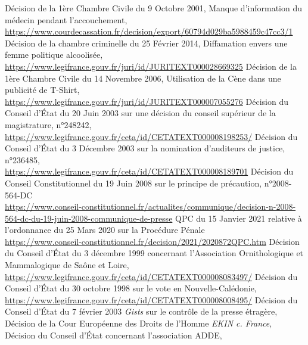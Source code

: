 \documentclass[math]{cours}
\begin{document}
\begin{thebibliography}{255}
		Décision de la 1ère Chambre Civile du 9 Octobre 2001, Manque d'information du médecin pendant l'accouchement,\\
		\url{https://www.courdecassation.fr/decision/export/60794d029ba5988459c47cc3/1}
		Décision de la chambre criminelle du 25 Février 2014, Diffamation envers une femme politique alcoolisée,\\
		\url{https://www.legifrance.gouv.fr/juri/id/JURITEXT000028669325}
		Décision de la 1ère Chambre Civile du 14 Novembre 2006, Utilisation de la Cène dans une publicité de T-Shirt,\\
		\url{https://www.legifrance.gouv.fr/juri/id/JURITEXT000007055276}
		Décision du Conseil d'État du 20 Juin 2003 sur une décision du conseil supérieur de la magistrature, n°248242,\\
		\url{https://www.legifrance.gouv.fr/ceta/id/CETATEXT000008198253/}
		Décision du Conseil d'État du 3 Décembre 2003 sur la nomination d'auditeurs de justice, n°236485,\\
		\url{https://www.legifrance.gouv.fr/ceta/id/CETATEXT000008189701}
		Décision du Conseil Constitutionnel du 19 Juin 2008 sur le principe de précaution, n°2008-564-DC\\
		\url{https://www.conseil-constitutionnel.fr/actualites/communique/decision-n-2008-564-dc-du-19-juin-2008-communique-de-presse}
		QPC du 15 Janvier 2021 relative à l'ordonnance du 25 Mars 2020 sur la Procédure Pénale\\
		\url{https://www.conseil-constitutionnel.fr/decision/2021/2020872QPC.htm}
		Décision du Conseil d'État du 3 décembre 1999 concernant l'Association Ornithologique et Mammalogique de Saône et Loire,\\
		\url{https://www.legifrance.gouv.fr/ceta/id/CETATEXT000008083497/}
		Décision du Conseil d'État du 30 octobre 1998 sur le vote en Nouvelle-Calédonie,\\
		\url{https://www.legifrance.gouv.fr/ceta/id/CETATEXT000008008495/}
		Décision du Conseil d'État du 7 février 2003 \textit{Gists} sur le contrôle de la presse étragère,\\
		\url{}
		Décision de la Cour Européenne des Droits de l'Homme \textit{EKIN c. France},\\
		\url{}
		Décision du Conseil d'État concernant l'association ADDE,\\

\end{thebibliography}
\end{document}
